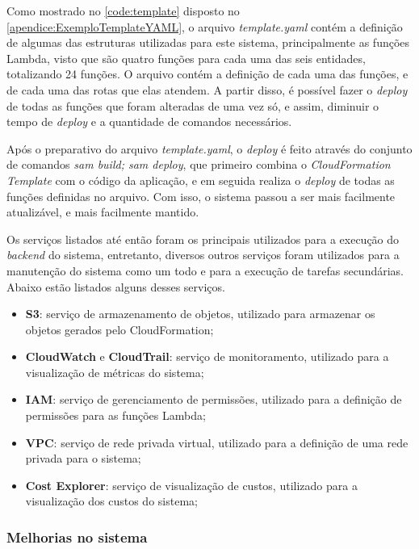 Como mostrado no \autoref{code:template} disposto no \autoref{apendice:ExemploTemplateYAML}, o arquivo \textit{template.yaml} contém a definição de algumas das estruturas utilizadas para este sistema, principalmente as funções Lambda, visto que são quatro funções para cada uma das seis entidades, totalizando 24 funções. O arquivo contém a definição de cada uma das funções, e de cada uma das rotas que elas atendem. A partir disso, é possível fazer o \textit{deploy} de todas as funções que foram alteradas de uma vez só, e assim, diminuir o tempo de \textit{deploy} e a quantidade de comandos necessários.

Após o preparativo do arquivo \textit{template.yaml}, o \textit{deploy} é feito através do conjunto de comandos \textit{sam build; sam deploy}, que primeiro combina o \textit{CloudFormation Template} com o código da aplicação, e em seguida realiza o \textit{deploy} de todas as funções definidas no arquivo. Com isso, o sistema passou a ser mais facilmente atualizável, e mais facilmente mantido.

 \label{ssssec:Outros serviços da AWS}

Os serviços listados até então foram os principais utilizados para a execução do \textit{backend} do sistema, entretanto, diversos outros serviços foram utilizados para a manutenção do sistema como um todo e para a execução de tarefas secundárias. Abaixo estão listados alguns desses serviços.

\begin{itemize}
  \item \textbf{S3}: serviço de armazenamento de objetos, utilizado para armazenar os objetos gerados pelo CloudFormation;
  \item \textbf{CloudWatch} e \textbf{CloudTrail}: serviço de monitoramento, utilizado para a visualização de métricas do sistema;
  \item \textbf{IAM}: serviço de gerenciamento de permissões, utilizado para a definição de permissões para as funções Lambda;
  \item \textbf{VPC}: serviço de rede privada virtual, utilizado para a definição de uma rede privada para o sistema;
  \item \textbf{Cost Explorer}: serviço de visualização de custos, utilizado para a visualização dos custos do sistema;
\end{itemize}

\subsubsection*{Melhorias no sistema} \label{sssec:Melhorias no Sistema}

